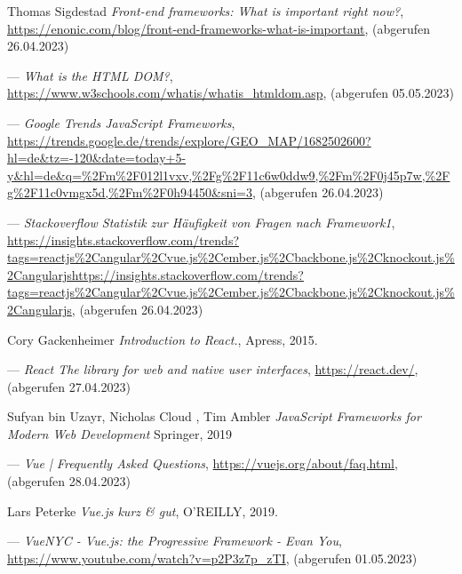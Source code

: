 %

\begin{thebibliography}{99}

    Thomas Sigdestad
	\emph{Front-end frameworks: What is important right now?},
	\url{https://enonic.com/blog/front-end-frameworks-what-is-important},
    (abgerufen 26.04.2023)

	---
	\emph{What is the HTML DOM?},
	\url{https://www.w3schools.com/whatis/whatis_htmldom.asp},
	(abgerufen 05.05.2023)

	---
	\emph{Google Trends JavaScript Frameworks},
	\url{https://trends.google.de/trends/explore/GEO_MAP/1682502600?hl=de&tz=-120&date=today+5-y&hl=de&q=%2Fm%2F012l1vxv,%2Fg%2F11c6w0ddw9,%2Fm%2F0j45p7w,%2Fg%2F11c0vmgx5d,%2Fm%2F0h94450&sni=3},
	(abgerufen 26.04.2023)

	---
	\emph{Stackoverflow Statistik zur Häufigkeit von Fragen nach Framework1},
	\url{https://insights.stackoverflow.com/trends?tags=reactjs%2Cangular%2Cvue.js%2Cember.js%2Cbackbone.js%2Cknockout.js%2Cangularjshttps://insights.stackoverflow.com/trends?tags=reactjs%2Cangular%2Cvue.js%2Cember.js%2Cbackbone.js%2Cknockout.js%2Cangularjs},
	(abgerufen 26.04.2023)

	Cory Gackenheimer
	\emph{Introduction to React.},
	Apress,
	2015.

	---
	\emph{React
	The library for web and native user interfaces},
	\url{https://react.dev/},
	(abgerufen 27.04.2023)

	Sufyan bin Uzayr, Nicholas Cloud , Tim Ambler
	\emph{JavaScript Frameworks for Modern Web Development}
	Springer,
	2019

	---
	\emph{Vue | Frequently Asked Questions},
	\url{https://vuejs.org/about/faq.html},
	(abgerufen 28.04.2023)

	Lars Peterke
	\emph{Vue.js kurz \& gut},
	O’REILLY,
	2019.

	---
	\emph{VueNYC - Vue.js: the Progressive Framework - Evan You},
	\url{https://www.youtube.com/watch?v=p2P3z7p_zTI},
	(abgerufen 01.05.2023)


\end{thebibliography}
